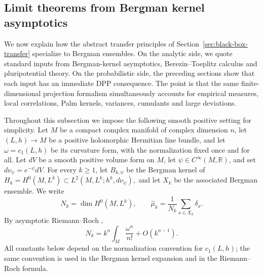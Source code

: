 \documentclass[12pt,a4paper,reqno]{article}
\theoremstyle{thmstyleone}
\theoremstyle{thmstylethree}
\theoremstyle{thmstyletwo}
\numberwithin{equation}{subsection}
\def\geq{\geqslant}
\begin{document}


\subsection{Limit theorems from Bergman kernel asymptotics}

We now explain how the abstract transfer principles of Section~\ref{sec:black-box-transfer} specialize to Bergman ensembles. On the analytic side, we quote standard inputs from Bergman-kernel asymptotics, Berezin--Toeplitz calculus and pluripotential theory. On the probabilistic side, the preceding sections show that each input has an immediate DPP consequence. The point is that the same finite-dimensional projection formalism simultaneously accounts for empirical measures, local correlations, Palm kernels, variances, cumulants and large deviations.

Throughout this subsection we impose the following smooth positive setting for simplicity. Let $M$ be a compact complex manifold of complex dimension $n$, let $(L,h)\to M$ be a positive holomorphic Hermitian line bundle, and let $\omega=c_1(L,h)$ be its curvature form, with the normalization fixed once and for all. Let $dV$ be a smooth positive volume form on $M$, let $\psi\in C^\infty(M,\mathbb R)$, and set $d\nu_\psi=e^{-\psi}dV.$ For every $k\geq 1$, let $B_{k,\psi}$ be the Bergman kernel of $H_k=H^0(M,L^k)\subset L^2(M,L^k;h^k,d\nu_\psi),$ and let $X_k$ be the associated Bergman ensemble. We write
\[
    N_k=\dim H^0(M,L^k),\qquad
    \widehat\mu_k=\frac1{N_k}\sum_{x\in X_k}\delta_x.
\]
By asymptotic Riemann--Roch \cite[Thm.~1.4.6]{MaMa},
\begin{equation}\label{eq:asympt-RR}
N_k=k^n\int_M \frac{\omega^n}{n!}+O(k^{n-1}).
\end{equation}
All constants below depend on the normalization convention for $c_1(L,h)$; the same convention is used in the Bergman kernel expansion and in the Riemann--Roch formula.
\end{document}
